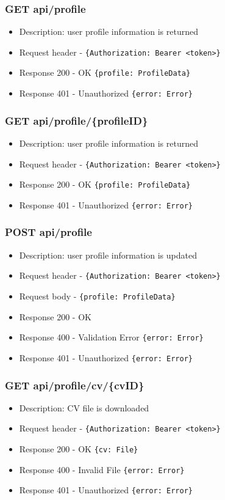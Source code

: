 \subsubsection{GET api/profile}
\begin{itemize}
    \item Description: user profile information is returned
    \item Request header - \verb|{Authorization: Bearer <token>}|
    \item Response 200 - OK \verb|{profile: ProfileData}|
    \item Response 401 - Unauthorized \verb|{error: Error}|
\end{itemize}

\subsubsection{GET api/profile/\{profileID\}}
\begin{itemize}
    \item Description: user profile information is returned
    \item Request header - \verb|{Authorization: Bearer <token>}|
    \item Response 200 - OK \verb|{profile: ProfileData}|
    \item Response 401 - Unauthorized \verb|{error: Error}|
\end{itemize}

\subsubsection{POST api/profile}
\begin{itemize}
    \item Description: user profile information is updated
    \item Request header - \verb|{Authorization: Bearer <token>}|
    \item Request body - \verb|{profile: ProfileData}|
    \item Response 200 - OK
    \item Response 400 - Validation Error \verb|{error: Error}|
    \item Response 401 - Unauthorized \verb|{error: Error}|
\end{itemize}

\subsubsection{GET api/profile/cv/\{cvID\}}
\begin{itemize}
    \item Description: CV file is downloaded
    \item Request header - \verb|{Authorization: Bearer <token>}|
    \item Response 200 - OK \verb|{cv: File}|
    \item Response 400 - Invalid File \verb|{error: Error}|
    \item Response 401 - Unauthorized \verb|{error: Error}|
\end{itemize}

